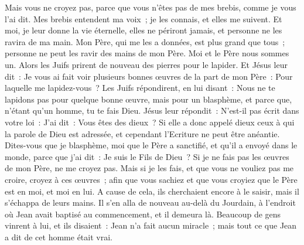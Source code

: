 \begin{multicols}{2}
Mais vous ne croyez pas, parce que vous n'êtes pas de mes brebis, comme je vous l'ai dit.
Mes brebis entendent ma voix~; je les connais, et elles me suivent.
Et moi, je leur donne la vie éternelle, elles ne périront jamais, et personne ne les ravira de ma main.
Mon Père, qui me les a données, est plus grand que tous~; personne ne peut les ravir des mains de mon Père.
Moi et le Père nous sommes un.
Alors les Juifs prirent de nouveau des pierres pour le lapider.
Et Jésus leur dit~: Je vous ai fait voir plusieurs bonnes œuvres de la part de mon Père~: Pour laquelle me lapidez-vous~?
Les Juifs répondirent, en lui disant~: Nous ne te lapidons pas pour quelque bonne œuvre, mais pour un blasphème, et parce que, n'étant qu'un homme, tu te fais Dieu.
Jésus leur répondit~: N'est-il pas écrit dans votre loi~: J'ai dit~: Vous êtes des dieux~?
Si elle a donc appelé dieux ceux à qui la parole de Dieu est adressée, et cependant l'Ecriture ne peut être anéantie.
Dites-vous que je blasphème, moi que le Père a sanctifié, et qu’il a envoyé dans le monde, parce que j’ai dit~: Je suis le Fils de Dieu~?
Si je ne fais pas les œuvres de mon Père, ne me croyez pas.
Mais si je les fais, et que vous ne vouliez pas me croire, croyez à ces œuvres~; afin que vous sachiez et que vous croyiez que le Père est en moi, et moi en lui.
A cause de cela, ils cherchaient encore à le saisir, mais il s'échappa de leurs mains.
Il s'en alla de nouveau au-delà du Jourdain, à l'endroit où Jean avait baptisé au commencement, et il demeura là.
Beaucoup de gens vinrent à lui, et ils disaient~: Jean n'a fait aucun miracle~; mais tout ce que Jean a dit de cet homme était vrai.

\end{multicols}
